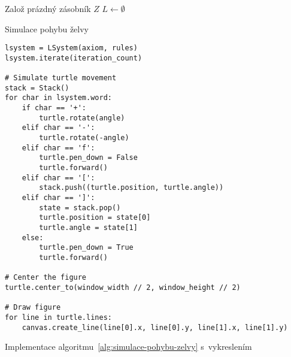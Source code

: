 \begin{algorithm}[H]
    Založ prázdný zásobník $Z$\;
    $L\gets\emptyset$\;
    \;
    \caption{Simulace pohybu želvy}
    \label{alg:simulace-pohybu-zelvy}
\end{algorithm}
\begin{program}[h]
\begin{lstlisting}[style=python]
lsystem = LSystem(axiom, rules)
lsystem.iterate(iteration_count)

# Simulate turtle movement
stack = Stack()
for char in lsystem.word:
    if char == '+':
        turtle.rotate(angle)
    elif char == '-':
        turtle.rotate(-angle)
    elif char == 'f':
        turtle.pen_down = False
        turtle.forward()
    elif char == '[':
        stack.push((turtle.position, turtle.angle))
    elif char == ']':
        state = stack.pop()
        turtle.position = state[0]
        turtle.angle = state[1]
    else:
        turtle.pen_down = True
        turtle.forward()

# Center the figure        
turtle.center_to(window_width // 2, window_height // 2)

# Draw figure
for line in turtle.lines:
    canvas.create_line(line[0].x, line[0].y, line[1].x, line[1].y)
\end{lstlisting}
    \caption{Implementace algoritmu~\ref{alg:simulace-pohybu-zelvy} s~vykreslením}
    \label{prog:simulace-pohybu-zelvy-a-vykresleni}
\end{program}